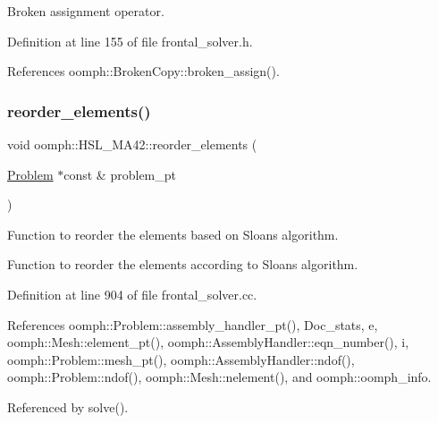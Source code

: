 Broken assignment operator. 



Definition at line 155 of file frontal\+\_\+solver.\+h.



References oomph\+::\+Broken\+Copy\+::broken\+\_\+assign().

\mbox{\label{classoomph_1_1HSL__MA42_a6ea4a5adf63088f155b81ab650f44347}} 
\subsubsection{\texorpdfstring{reorder\+\_\+elements()}{reorder\_elements()}}
{\footnotesize\ttfamily void oomph\+::\+H\+S\+L\+\_\+\+M\+A42\+::reorder\+\_\+elements (\begin{DoxyParamCaption}\item[{\hyperlink{classoomph_1_1Problem}{Problem} $\ast$const \&}]{problem\+\_\+pt }\end{DoxyParamCaption})}



Function to reorder the elements based on Sloan\textquotesingle{}s algorithm. 

Function to reorder the elements according to Sloan\textquotesingle{}s algorithm. 

Definition at line 904 of file frontal\+\_\+solver.\+cc.



References oomph\+::\+Problem\+::assembly\+\_\+handler\+\_\+pt(), Doc\+\_\+stats, e, oomph\+::\+Mesh\+::element\+\_\+pt(), oomph\+::\+Assembly\+Handler\+::eqn\+\_\+number(), i, oomph\+::\+Problem\+::mesh\+\_\+pt(), oomph\+::\+Assembly\+Handler\+::ndof(), oomph\+::\+Problem\+::ndof(), oomph\+::\+Mesh\+::nelement(), and oomph\+::oomph\+\_\+info.



Referenced by solve().

\mbox{\label{classoomph_1_1HSL__MA42_ad59ac679b479c977c8611065c5bea91b}} 
